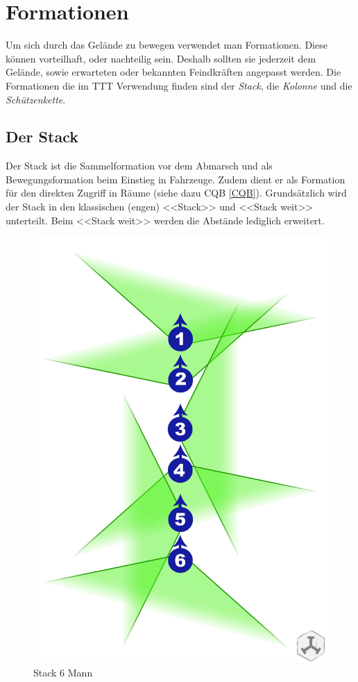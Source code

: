 \section{Formationen}
Um sich durch das Gelände zu bewegen verwendet man Formationen. Diese können vorteilhaft, oder nachteilig sein. Deshalb sollten sie jederzeit dem Gelände, sowie erwarteten oder bekannten Feindkräften angepasst werden. Die Formationen die im TTT Verwendung finden sind der \textit{Stack}, die \textit{Kolonne} und die \textit{Schützenkette}. 

\subsection{Der Stack}
Der Stack ist die Sammelformation vor dem Abmarsch und als Bewegungsformation beim Einstieg in Fahrzeuge. Zudem dient er als Formation für den direkten Zugriff in Räume (siehe dazu CQB \autoref{CQB}). Grundsätzlich wird der Stack in den klassischen (engen) <<Stack>> und <<Stack weit>> unterteilt. Beim <<Stack weit>> werden die Abstände lediglich erweitert.\\
\begin{figure}[!htb]
	\centering
	\includegraphics[width=15cm]{./img/grundlagen/formationen/stack_6mann.jpg}
	\caption{Stack 6 Mann}
\end{figure}

